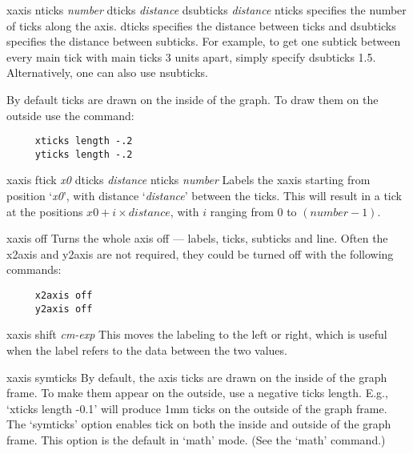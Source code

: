 \begin{commanddescription}
\item[{\sf xaxis nticks {\it number} dticks {\it distance} dsubticks {\it distance}} ]
{\sf nticks} specifies the number of ticks along the axis.  {\sf dticks}
specifies the distance between ticks and {\sf dsubticks}
specifies the distance between subticks.  For example, to get one subtick
between every main tick with main ticks 3 units apart, simply specify
{\sf dsubticks 1.5}. Alternatively, one can also use {\sf nsubticks}.

By default ticks are drawn on the inside of the graph.  To draw
them on the outside use the command:

\preglecode{}
\begin{Verbatim}
     xticks length -.2
     yticks length -.2
\end{Verbatim}
\postglecode{}

\item[{\sf xaxis ftick {\it x0} dticks {\it distance} nticks {\it number}}]
Labels the xaxis starting from position `{\it x0}', with distance `{\it distance}' between the ticks. This will result in a tick at the positions $\mathit{x0} + i \times \mathit{distance}$, with $i$ ranging from 0 to $(\mathit{number}-1)$.

\item[{\sf xaxis off}  ]
Turns the whole axis off --- labels, ticks, subticks and line.
Often the x2axis and y2axis are not required, they could be
turned off with the following commands:

\preglecode{}
\begin{Verbatim}
     x2axis off
     y2axis off
\end{Verbatim}
\postglecode{}

\item[{\sf xaxis shift {\it cm-exp}}  ]
This moves the labeling to the left or right, which is useful when
the label refers to the data between the two values.

\item[{\sf xaxis symticks}]
By default, the axis ticks are drawn on the inside of the graph frame. To make them appear on the outside, use a negative ticks length. E.g., `{\sf xticks length -0.1}' will produce 1mm ticks on the outside of the graph frame. The `symticks' option enables tick on both the inside and outside of the graph frame. This option is the default in `math' mode. (See the `{\sf math}' command.)


\end{commanddescription}
